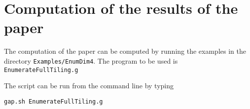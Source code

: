 \documentclass[12pt]{amsart}
\begin{document}
\section{Computation of the results of the paper}

The computation of the paper can be computed by running the examples in the directory {\tt Examples/EnumDim4}.
The program to be used is {\tt EnumerateFullTiling.g}

The script can be run from the command line by typing
\begin{verbatim}
gap.sh EnumerateFullTiling.g
\end{verbatim}
\end{document}
